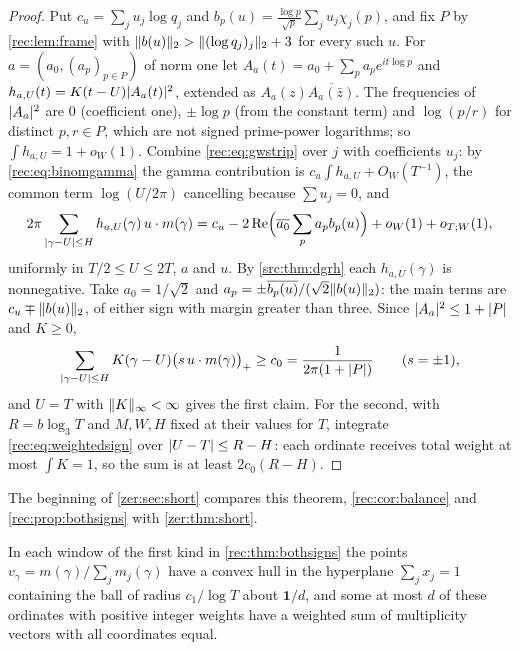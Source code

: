 \begin{proof}
Put $c_u=\sum_ju_j\log q_j$ and $b_p(u)=\frac{\log p}{\sqrt p}\sum_ju_j\chi_j(p)$, and fix $P$ by
\cref{rec:lem:frame} with $\lVert b(u)\rVert_2>\lVert(\log q_j)_j\rVert_2+3$ for every such $u$. For $a=(a_0,(a_p)_{p\in P})$
of norm one let $A_a(t)=a_0+\sum_pa_pe^{it\log p}$ and $h_{a,U}(t)=K(t-U)\lvert A_a(t)\rvert^2$, extended as
$A_a(z)\overline{A_a(\bar z)}$. The frequencies of $\lvert A_a\rvert^2$ are $0$ (coefficient one), $\pm\log p$ (from the
constant term) and $\log(p/r)$ for distinct $p,r\in P$, which are not signed prime-power logarithms;
so $\int h_{a,U}=1+o_W(1)$. Combine \eqref{rec:eq:gwstrip} over $j$ with coefficients $u_j$: by
\eqref{rec:eq:binomgamma} the gamma contribution is $c_u\int h_{a,U}+O_W(T^{-1})$, the common term
$\log(U/2\pi)$ cancelling because $\sum u_j=0$, and
\[
 2\pi\sum_{\lvert\gamma-U\rvert\le H}h_{a,U}(\gamma)\,u\cdot m(\gamma)=c_u-2\operatorname{Re}\Bigl(\overline{a_0}\sum_pa_pb_p(u)\Bigr)+o_W(1)+o_{T;W}(1),
\]
uniformly in $T/2\le U\le2T$, $a$ and $u$. By \cref{src:thm:dgrh} each $h_{a,U}(\gamma)$ is nonnegative.
Take $a_0=1/\sqrt2$ and $a_p=\pm\overline{b_p(u)}/(\sqrt2\lVert b(u)\rVert_2)$: the main terms are $c_u\mp\lVert b(u)\rVert_2$,
of either sign with margin greater than three. Since $\lvert A_a\rvert^2\le1+\lvert P\rvert$ and $K\ge0$,
\begin{equation}\label{rec:eq:weightedsign}
 \sum_{\lvert\gamma-U\rvert\le H}K(\gamma-U)\bigl(s\,u\cdot m(\gamma)\bigr)_+\ge c_0=\frac1{2\pi(1+\lvert P\rvert)}\qquad(s=\pm1),
\end{equation}
and $U=T$ with $\lVert K\rVert_\infty<\infty$ gives the first claim. For the second, with $R=b\log_3T$ and
$M,W,H$ fixed at their values for $T$, integrate \eqref{rec:eq:weightedsign} over $\lvert U-T\rvert\le R-H$:
each ordinate receives total weight at most $\int K=1$, so the sum is at least $2c_0(R-H)$.
\end{proof}

The beginning of \cref{zer:sec:short} compares this theorem, \cref{rec:cor:balance} and
\cref{rec:prop:bothsigns} with \cref{zer:thm:short}.

\begin{corollary}\label{rec:cor:balance}
In each window of the first kind in \cref{rec:thm:bothsigns} the points
$v_\gamma=m(\gamma)/\sum_jm_j(\gamma)$ have a convex hull in the hyperplane $\sum_jx_j=1$ containing the
ball of radius $c_1/\log T$ about $\mathbf 1/d$, and some at most $d$ of these ordinates with
positive integer weights have a weighted sum of multiplicity vectors with all coordinates equal.
\end{corollary}

